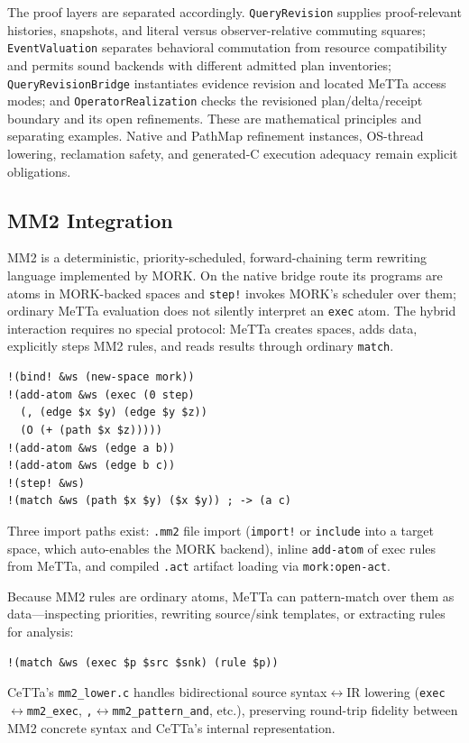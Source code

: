 \documentclass[11pt]{article}
\newcommand{\code}[1]{\texttt{#1}}
\newcommand{\CeTTa}{\textup{CeTTa}}
\newcommand{\PathMap}{\textup{PathMap}}
\begin{document}
The proof layers are separated accordingly.  \code{QueryRevision} supplies
proof-relevant histories, snapshots, and literal versus observer-relative
commuting squares; \code{EventValuation} separates behavioral commutation from
resource compatibility and permits sound backends with different admitted
plan inventories; \code{QueryRevisionBridge} instantiates evidence revision
and located MeTTa access modes; and \code{OperatorRealization} checks the
revisioned plan/delta/receipt boundary and its open refinements.  These are
mathematical principles and separating examples.  Native and \PathMap{}
refinement instances, OS-thread lowering, reclamation safety, and generated-C
execution adequacy remain explicit obligations.

\subsection{MM2 Integration}
\label{sec:mm2-integration}

MM2 is a deterministic, priority-scheduled, forward-chaining term rewriting
language implemented by MORK\@.  On the native bridge route its programs are
atoms in MORK-backed spaces and \code{step!} invokes MORK's scheduler over
them; ordinary MeTTa evaluation does not silently interpret an \code{exec}
atom.  The hybrid interaction requires no special protocol: MeTTa creates
spaces, adds data, explicitly steps MM2 rules, and reads results through
ordinary \code{match}.

\begin{verbatim}
!(bind! &ws (new-space mork))
!(add-atom &ws (exec (0 step)
  (, (edge $x $y) (edge $y $z))
  (O (+ (path $x $z)))))
!(add-atom &ws (edge a b))
!(add-atom &ws (edge b c))
!(step! &ws)
!(match &ws (path $x $y) ($x $y)) ; -> (a c)
\end{verbatim}

Three import paths exist: \code{.mm2} file import (\code{import!} or
\code{include} into a target space, which auto-enables the MORK backend),
inline \code{add-atom} of exec rules from MeTTa, and compiled \code{.act}
artifact loading via \code{mork:open-act}.

Because MM2 rules are ordinary atoms, MeTTa can pattern-match over them as
data---inspecting priorities, rewriting source/sink templates, or extracting
rules for analysis:
\begin{verbatim}
!(match &ws (exec $p $src $snk) (rule $p))
\end{verbatim}

\CeTTa{}'s \code{mm2\_lower.c} handles bidirectional
source syntax$\leftrightarrow$IR lowering
(\code{exec}$\leftrightarrow$\code{mm2\_exec},
\code{,}$\leftrightarrow$\code{mm2\_pattern\_and}, etc.), preserving
round-trip fidelity between MM2 concrete syntax and \CeTTa{}'s internal
representation.
\end{document}
